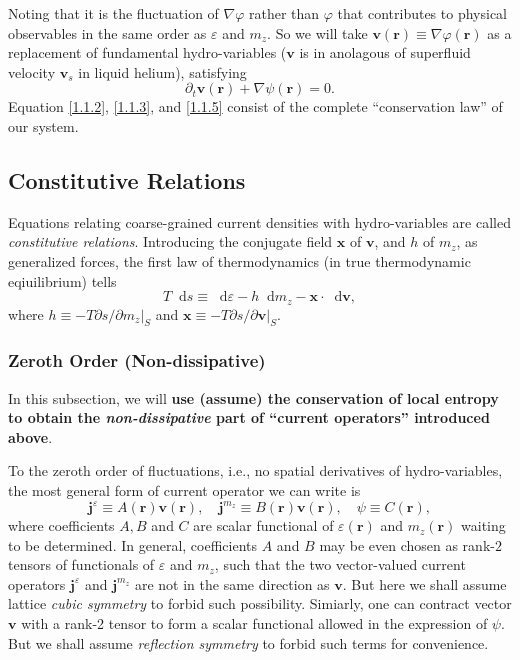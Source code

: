 \documentclass[10pt,nofootinbib]{revtex4}
\newcommand*\dd{\mathop{}\!\mathrm{d}}
\begin{document}
		Noting that it is the fluctuation of $\nabla\varphi$ rather than $\varphi$ that contributes to physical observables in the same order as $\varepsilon$ and $m_z$. So we will take $\bm{v}(\bm{r})\equiv\nabla\varphi(\bm{r})$ as a replacement of fundamental hydro-variables ($\bm{v}$ is in anolagous of superfluid velocity $\bm{v}_s$ in liquid helium), satisfying
		\begin{equation}\label{1.1.5}
			\partial_t\bm{v}(\bm{r})+\nabla\psi(\bm{r})=0.
		\end{equation}
		Equation \eqref{1.1.2}, \eqref{1.1.3}, and \eqref{1.1.5} consist of the complete ``conservation law'' of our system.

	\subsection{Constitutive Relations}
		Equations relating coarse-grained current densities with hydro-variables are called \emph{constitutive relations}. Introducing the conjugate field $\bm{x}$ of $\bm{v}$, and $h$ of $m_z$, as generalized forces, the first law of thermodynamics (in true thermodynamic eqiuilibrium) tells
		\begin{equation}\label{2.0.1}
			T\dd s\equiv\dd \varepsilon-h\dd m_z-\bm{x}\cdot\dd\bm{v},
		\end{equation}
		where $h\equiv-T \partial s/\partial m_z|_S$ and $\bm{x}\equiv-T\partial s/\partial \bm{v}|_S$. 

		\subsubsection{Zeroth Order (Non-dissipative)}
			In this subsection, we will {\bf use (assume) the conservation of local entropy to obtain the \emph{non-dissipative} part of ``current operators'' introduced above}. \par
			To the zeroth order of fluctuations, i.e., no spatial derivatives of hydro-variables, the most general form of current operator we can write is
			\begin{equation}\label{2.1.1}
				\bm{j}^\varepsilon\equiv A(\bm{r})\bm{v}(\bm{r}),\quad \bm{j}^{m_z}\equiv B(\bm{r})\bm{v}(\bm{r}),\quad \psi\equiv C(\bm{r}),
			\end{equation}
			where coefficients $A,B$ and $C$ are scalar functional of $\varepsilon(\bm{r})$ and $m_z(\bm{r})$ waiting to be determined. In general, coefficients $A$ and $B$ may be even chosen as rank-$2$ tensors of functionals of $\varepsilon$ and $m_z$, such that the two vector-valued current operators $\bm{j}^\varepsilon$ and $\bm{j}^{m_z}$ are not in the same direction as $\bm{v}$. {\color{red}But here we shall assume lattice \emph{cubic symmetry} \cite{halperin1969hydrodynamic} to forbid such possibility}. Simiarly, one can contract vector $\bm{v}$ with a rank-2 tensor to form a scalar functional allowed in the expression of $\psi$. {\color{red}But we shall assume \emph{reflection symmetry} to forbid such terms for convenience}.\par
\end{document}
